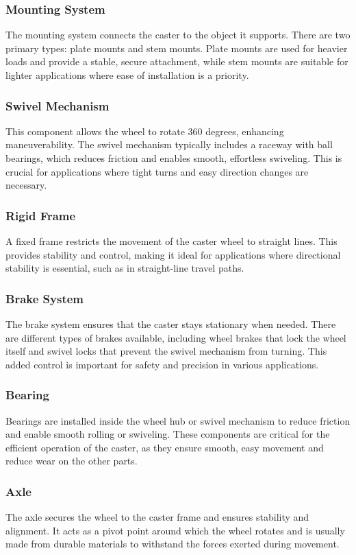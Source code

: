 \documentclass[../../main]{subfiles}
\begin{document}
\subsubsection{Mounting System}
The mounting system connects the caster to the object it supports. There are two primary types: plate mounts and stem mounts. Plate mounts are used for heavier loads and provide a stable, secure attachment, while stem mounts are suitable for lighter applications where ease of installation is a priority.

\subsubsection{Swivel Mechanism}
This component allows the wheel to rotate 360 degrees, enhancing maneuverability. The swivel mechanism typically includes a raceway with ball bearings, which reduces friction and enables smooth, effortless swiveling. This is crucial for applications where tight turns and easy direction changes are necessary.

\subsubsection{Rigid Frame}
A fixed frame restricts the movement of the caster wheel to straight lines. This provides stability and control, making it ideal for applications where directional stability is essential, such as in straight-line travel paths.

\subsubsection{Brake System}
The brake system ensures that the caster stays stationary when needed. There are different types of brakes available, including wheel brakes that lock the wheel itself and swivel locks that prevent the swivel mechanism from turning. This added control is important for safety and precision in various applications.

\subsubsection{Bearing}
Bearings are installed inside the wheel hub or swivel mechanism to reduce friction and enable smooth rolling or swiveling. These components are critical for the efficient operation of the caster, as they ensure smooth, easy movement and reduce wear on the other parts.

\subsubsection{Axle}
The axle secures the wheel to the caster frame and ensures stability and alignment. It acts as a pivot point around which the wheel rotates and is usually made from durable materials to withstand the forces exerted during movement.
\end{document}
